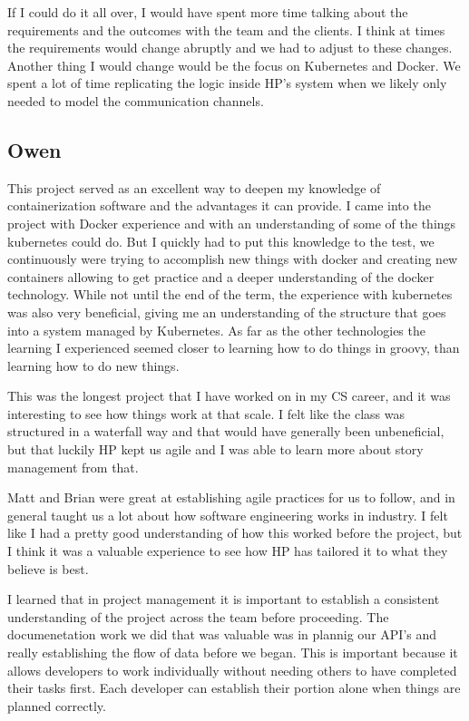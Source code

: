 \documentclass[onecolumn, draftclsnofoot,10pt, compsoc]{IEEEtran}
\begin{document}
If I could do it all over, I would have spent more time talking about the requirements and the outcomes with the team and the clients. I think at times the requirements would change abruptly and we had to adjust to these changes. Another thing I would change would be the focus on Kubernetes and Docker. We spent a lot of time replicating the logic inside HP's system when we likely only needed to model the communication channels. 


\subsection{Owen}
This project served as an excellent way to deepen my knowledge of containerization software and the advantages it can provide. I came into the project with Docker experience and with an understanding of some of the things kubernetes could do. But I quickly had to put this knowledge to the test, we continuously were trying to accomplish new things with docker and creating new containers allowing to get practice and a deeper understanding of the docker technology. While not until the end of the term, the experience with kubernetes was also very beneficial, giving me an understanding of the structure that goes into a system managed by Kubernetes. As far as the other technologies the learning I experienced seemed closer to learning how to do things in groovy, than learning how to do new things.

This was the longest project that I have worked on in my CS career, and it was interesting to see how things work at that scale. I felt like the class was structured in a waterfall way and that would have generally been unbeneficial, but that luckily HP kept us agile and I was able to learn more about story management from that.

Matt and Brian were great at establishing agile practices for us to follow, and in general taught us a lot about how software engineering works in industry. I felt like I had a pretty good understanding of how this worked before the project, but I think it was a valuable experience to see how HP has tailored it to what they believe is best. 

I learned that in project management it is important to establish a consistent understanding of the project across the team before proceeding. The documenetation work we did that was valuable was in plannig our API's and really establishing the flow of data before we began. This is important because it allows developers to work individually without needing others to have completed their tasks first. Each developer can establish their portion alone when things are planned correctly.
\end{document}
